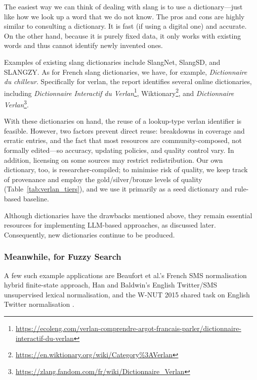 \documentclass[12pt]{article}
\begin{document}
The easiest way we can think of dealing with slang is to use a dictionary\;---\;just like how we look up a word that we do not know. The pros and cons are highly similar to consulting a dictionary. It is fast (if using a digital one) and accurate. On the other hand, because it is purely fixed data, it only works with existing words and thus cannot identify newly invented ones.

Examples of existing slang dictionaries include SlangNet, SlangSD, and SLANGZY\cite{dhuliawala2016slangnet, wu2018slangsd, gupta2019slangzy}. As for French slang dictionaries, we have, for example, \textit{Dictionnaire du chilleur}\cite{dictionnaire2024chilleur}. Specifically for verlan, the report identifies several online dictionaries, including \textit{Dictionnaire Interactif du Verlan}\footnote{\url{https://ecoleng.com/verlan-comprendre-argot-francais-parler/dictionnaire-interactif-du-verlan}}, Wiktionary\footnote{\url{https://en.wiktionary.org/wiki/Category\%3AVerlan}}, and \textit{Dictionnaire Verlan}\footnote{\url{https://zlang.fandom.com/fr/wiki/Dictionnaire_Verlan}}.

With these dictionaries on hand, the reuse of a lookup-type verlan identifier is feasible. However, two factors prevent direct reuse: breakdowns in coverage and erratic entries, and the fact that most resources are community-composed, not formally edited\;---\;so accuracy, updating policies, and quality control vary. In addition, licensing on some sources may restrict redistribution. Our own dictionary, too, is researcher-compiled; to minimise risk of quality, we keep track of provenance and employ the gold/silver/bronze levels of quality (Table~\ref{tab:verlan_tiers}), and we use it primarily as a seed dictionary and rule-based baseline.

Although dictionaries have the drawbacks mentioned above, they remain essential resources for implementing LLM-based approaches, as discussed later. Consequently, new dictionaries continue to be produced.


\subsubsection{Meanwhile, for Fuzzy Search}

A few such example applications are Beaufort et al.'s French SMS normalisation hybrid finite-state approach, Han and Baldwin's English Twitter/SMS unsupervised lexical normalisation, and the W-NUT 2015 shared task on English Twitter normalisation \cite{beaufort2010hybrid,han2011lexical,baldwin2015shared}.
\end{document}
